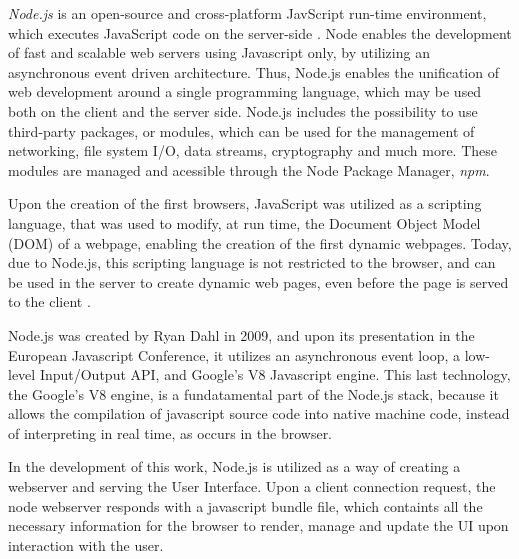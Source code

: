 
\textit{Node.js} \cite{nodejs} is an open-source and cross-platform JavScript run-time environment,
which executes JavaScript code on the server-side \cite{node_article}. Node enables the development of fast and scalable web servers using Javascript only,
by utilizing an asynchronous event driven architecture.
Thus, Node.js enables the unification of web development around a single 
programming language, which may be used both on the client and the server side.
Node.js includes the possibility to use third-party packages, or modules, which can be used for the management 
of networking, file system I/O, data streams, cryptography and much more. These modules are managed and acessible 
through the Node Package Manager, \textit{npm}.

Upon the creation of the first browsers, JavaScript was utilized as a scripting language, that was used to modify, at run time, the Document Object Model (DOM)
of a webpage, enabling the creation of the first dynamic webpages. Today, due to Node.js, this scripting language 
is not restricted to the browser, and can be used in the server to create dynamic web pages, even before the page is served to the client \cite{node_book}.

Node.js was created by Ryan Dahl in 2009, and upon its presentation in the European Javascript Conference,
it utilizes an asynchronous event loop, a low-level Input/Output API, and Google's V8 Javascript engine.
This last technology, the Google's V8 engine, is a fundatamental part of the Node.js stack, because it allows the compilation 
of javascript source code into native machine code, instead of interpreting in real time, as occurs in the browser.

In the development of this work, Node.js is utilized as a way of creating a webserver and serving the User Interface.
Upon a client connection request, the node webserver responds with a javascript bundle file, which containts all the necessary information
for the browser to render, manage and update the UI upon interaction with the user. 